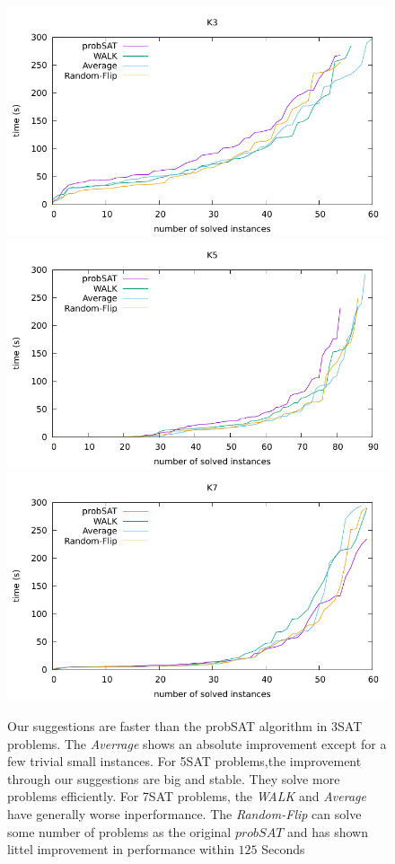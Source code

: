 \documentclass[12pt,a4paper,twoside]{scrartcl}
\numberwithin{equation}{section}
\begin{document}
\clearpage
\begin{figure}[H]
\begin{center}
  \includegraphics[scale = 0.8]{DATA/K3/e2.pdf}
    \includegraphics[scale = 0.8]{DATA/K5/e2.pdf}
      \includegraphics[scale = 0.8]{DATA/K7/e2.pdf}

  \end{center}
  \caption{Our suggestions are faster than the probSAT algorithm in 3SAT problems. The \emph{Averrage} shows an absolute improvement except for a few trivial small instances. For 5SAT problems,the improvement through our suggestions are big and stable. They solve more problems efficiently. For 7SAT problems, the \emph{WALK} and \emph{Average} have generally worse inperformance. The \emph{Random-Flip} can solve some number of problems as the original $probSAT$ and has shown littel improvement in performance within $125$ Seconds}

  \label{Experiment 2 cactus plot}
  \end{figure}
\clearpage
\end{document}
